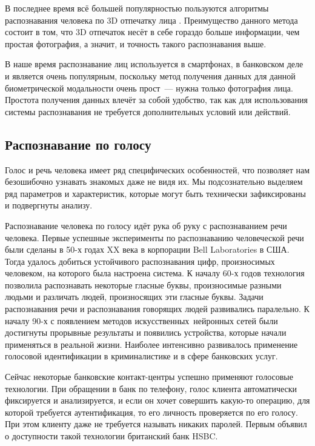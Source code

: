 \documentclass[14pt, a4paper]{extarticle}
\begin{document}
В последнее время всё большей популярностью пользуются алгоритмы распознавания человека по 3D отпечатку лица \cite{paysan20093d}. Преимущество данного метода состоит в том, что 3D отпечаток несёт в себе гораздо больше информации, чем простая фотография, а значит, и точность такого распознавания выше.

В наше время распознавание лиц используется в смартфонах, в банковском деле и является очень популярным, поскольку метод получения данных для данной биометрической модальности очень прост~--- нужна только фотография лица. Простота получения данных влечёт за собой удобство, так как для использования системы распознавания не требуется дополнительных условий или действий.

\subsection{Распознавание по голосу}
Голос и речь человека имеет ряд специфических особенностей, что позволяет нам безошибочно узнавать знакомых даже не видя их. Мы подсознательно выделяем ряд параметров и характеристик, которые могут быть технически зафиксированы и подвергнуты анализу.

Распознавание человека по голосу идёт рука об руку с распознаванием речи человека. Первые успешные эксперименты по распознаванию человеческой речи были сделаны в 50-х годах XX века в корпорации Bell Laboratories в США. Тогда удалось добиться устойчивого распознавания цифр, произносимых человеком, на которого была настроена система. К началу 60-х годов технология позволила распознавать некоторые гласные буквы, произносимые разными людьми и различать людей, произносящих эти гласные буквы. Задачи распознавания речи и распознавания говорящих людей развивались паралельно. К началу 90-х с появлением методов искусственных нейронных сетей были достигнуты прорывные результаты и появились устройства, которые начали применяться в реальной жизни. Наиболее интенсивно развивалось применение голосовой идентификации в криминалистике и в сфере банковских услуг. 

Сейчас некоторые банковские контакт-центры успешно применяют голосовые технологии. При обращении в банк по телефону, голос клиента автоматически фиксируется и анализируется, и если он хочет совершить какую-то операцию, для которой требуется аутентификация, то его личность проверяется по его голосу. При этом клиенту даже не требуется называть никаких паролей. Первым объявил о доступности такой технологии британский банк HSBC. 
\end{document}
